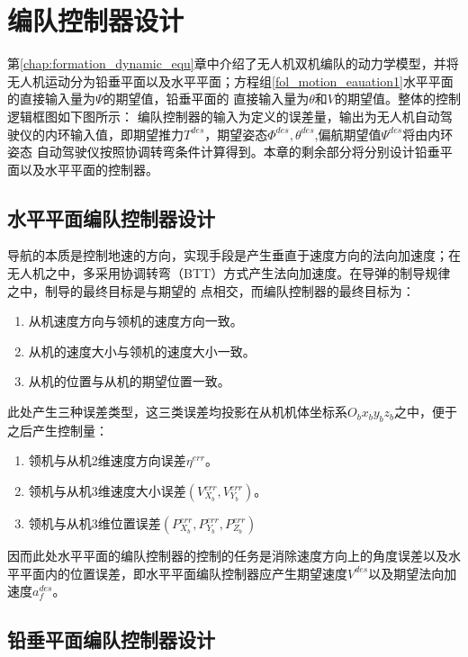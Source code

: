 \chapter{编队控制器设计}
\label{chap:controller_design}
第\ref{chap:formation_dynamic_equ}章中介绍了无人机双机编队的动力学模型，并将无人机运动分为铅垂平面以及水平平面；方程组\ref{fol_motion_eauation1}水平平面的直接输入量为$\Psi$的期望值，铅垂平面的
直接输入量为$\theta$和$V$的期望值。整体的控制逻辑框图如下图所示：
编队控制器的输入为定义的误差量，输出为无人机自动驾驶仪的内环输入值，即期望推力$T^{des}$，期望姿态$\Phi^{des},\theta^{des}$,偏航期望值$\Psi^{des}$将由内环姿态
自动驾驶仪按照协调转弯条件计算得到。本章的剩余部分将分别设计铅垂平面以及水平平面的控制器。
\section{水平平面编队控制器设计}
导航的本质是控制地速的方向，实现手段是产生垂直于速度方向的法向加速度；在无人机之中，多采用协调转弯（BTT）方式产生法向加速度。在导弹的制导规律之中，制导的最终目标是与期望的
点相交，而编队控制器的最终目标为：
\begin{enumerate}
    \item 从机速度方向与领机的速度方向一致。
    \item 从机的速度大小与领机的速度大小一致。
    \item 从机的位置与从机的期望位置一致。
\end{enumerate}
此处产生三种误差类型，这三类误差均投影在从机机体坐标系$O_bx_by_bz_b$之中，便于之后产生控制量：
\begin{enumerate}
    \item 领机与从机2维速度方向误差$\eta^{err}$。%
    \item 领机与从机3维速度大小误差$(V_{X_b}^{err},V_{Y_b}^{err})$。
    \item 领机与从机3维位置误差$(P_{X_b}^{err},P_{Y_b}^{err},P_{Z_b}^{err})$
\end{enumerate}
因而此处水平平面的编队控制器的控制的任务是消除速度方向上的角度误差以及水平平面内的位置误差，即水平平面编队控制器应产生期望速度$V^{des}$以及期望法向加速度$a_{f}^{des}$。
\section{铅垂平面编队控制器设计}
